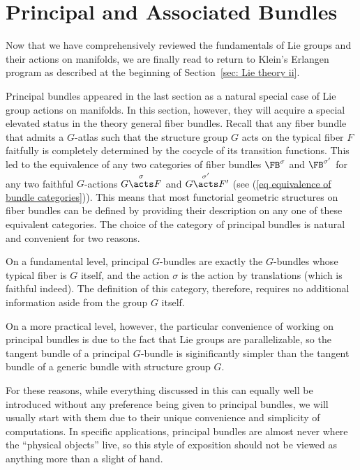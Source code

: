 \section{Principal and Associated Bundles}

\begin{hrem*}
    \small 
    Now that we have comprehensively reviewed the fundamentals of Lie groups and their actions on manifolds, we are finally read to return to Klein's Erlangen program as described at the beginning of Section~\ref{sec: Lie theory ii}.

    Principal bundles appeared in the last section as a natural special case of Lie group actions on manifolds. In this section, however, they will acquire a special elevated status in the theory general fiber bundles. Recall that any fiber bundle that admits a $G$-atlas  such that the structure group $G$ acts on the typical fiber $F$ faitfully is completely determined by the cocycle of its transition functions. This led to the equivalence of any two categories of fiber bundles $\FB^\sigma$ and $\FB^{\sigma'}$ for any two faithful $G$-actions $G\overset{\sigma}{\acts}F$ and $G\overset{\sigma'}{\acts}F'$ (see (\ref{eq equivalence of bundle categories})). This means that most functorial geometric structures on fiber bundles can be defined by providing their description on any one of these equivalent categories. The choice of the category of principal bundles is natural and convenient for two reasons. 
    
    On a fundamental level, principal $G$-bundles are exactly the $G$-bundles whose typical fiber is $G$ itself, and the action $\sigma$ is the action by translations (which is faithful indeed). The definition of this category, therefore, requires no additional information aside from the group $G$ itself. 
    
    On a more practical level, however, the particular convenience of working on principal bundles is due to the fact that Lie groups are parallelizable, so the tangent bundle of a principal $G$-bundle is siginificantly simpler than the tangent bundle of a generic bundle with structure group $G$. 

    For these reasons, while everything discussed in this \sect can equally well be introduced without any preference being given to principal bundles, we will usually start with them due to their unique convenience and simplicity of computations. In specific applications, principal bundles are almost never where the ``physical objects'' live, so this style of exposition should not be viewed as anything more than a slight of hand.
\end{hrem*}









